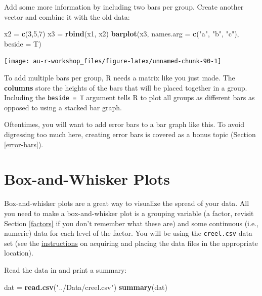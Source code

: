 \documentclass[]{book}
\newenvironment{Shaded}{\begin{snugshade}}{\end{snugshade}}
\newcommand{\KeywordTok}[1]{\textcolor[rgb]{0.13,0.29,0.53}{\textbf{#1}}}
\newcommand{\DataTypeTok}[1]{\textcolor[rgb]{0.13,0.29,0.53}{#1}}
\newcommand{\DecValTok}[1]{\textcolor[rgb]{0.00,0.00,0.81}{#1}}
\newcommand{\StringTok}[1]{\textcolor[rgb]{0.31,0.60,0.02}{#1}}
\newcommand{\NormalTok}[1]{#1}
\theoremstyle{definition}
\theoremstyle{definition}
\theoremstyle{definition}
\theoremstyle{remark}
\begin{document}
Add some more information by including two bars per group. Create
another vector and combine it with the old data:

\begin{Shaded}
\begin{Highlighting}[]
\NormalTok{x2 =}\StringTok{ }\KeywordTok{c}\NormalTok{(}\DecValTok{3}\NormalTok{,}\DecValTok{5}\NormalTok{,}\DecValTok{7}\NormalTok{)}
\NormalTok{x3 =}\StringTok{ }\KeywordTok{rbind}\NormalTok{(x1, x2)}
\KeywordTok{barplot}\NormalTok{(x3, }\DataTypeTok{names.arg =} \KeywordTok{c}\NormalTok{(}\StringTok{"a"}\NormalTok{, }\StringTok{"b"}\NormalTok{, }\StringTok{"c"}\NormalTok{), }\DataTypeTok{beside =}\NormalTok{ T)}
\end{Highlighting}
\end{Shaded}

\begin{center}\texttt{[image: au-r-workshop\_files/figure-latex/unnamed-chunk-90-1]} \end{center}

To add multiple bars per group, R needs a matrix like you just made. The
\textbf{columns} store the heights of the bars that will be placed
together in a group. Including the \texttt{beside\ =\ T} argument tells
R to plot all groups as different bars as opposed to using a stacked bar
graph.

Oftentimes, you will want to add error bars to a bar graph like this. To
avoid digressing too much here, creating error bars is covered as a
bonus topic (Section \ref{error-bars}).

\section{Box-and-Whisker Plots}\label{box-whisker}

Box-and-whisker plots are a great way to visualize the spread of your
data. All you need to make a box-and-whisker plot is a grouping variable
(a factor, revisit Section \ref{factors} if you don't remember what
these are) and some continuous (i.e., numeric) data for each level of
the factor. You will be using the \texttt{creel.csv} data set (see the
\protect\hyperlink{data-sets}{instructions} on acquiring and placing the
data files in the appropriate location).

Read the data in and print a summary:

\begin{Shaded}
\begin{Highlighting}[]
\NormalTok{dat =}\StringTok{ }\KeywordTok{read.csv}\NormalTok{(}\StringTok{"../Data/creel.csv"}\NormalTok{)}
\KeywordTok{summary}\NormalTok{(dat)}
\end{Highlighting}
\end{Shaded}
\end{document}
